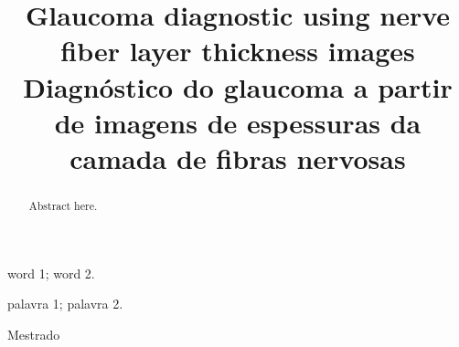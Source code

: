 \documentclass[conference]{IEEEtran}
\begin{document}
\title{Glaucoma diagnostic using nerve fiber layer thickness images \\ Diagnóstico do glaucoma a partir de imagens de espessuras da camada de fibras nervosas}


\author{
}


\maketitle

\thispagestyle{fancy}

\renewcommand{\abstractname}{Abstract}
\begin{abstract}
Abstract here.
\end{abstract}

\renewcommand\IEEEkeywordsname{Keywords}
\begin{IEEEkeywords}
\label{Keywords}
word 1; word 2.
\end{IEEEkeywords}

\renewcommand{\abstractname}{Resumo}
\begin{abstract}
\label{Resumo}

\end{abstract}

\renewcommand\IEEEkeywordsname{Palavras-chave}
\begin{IEEEkeywords}
\label{Palavras-chave}
palavra 1; palavra 2.
\end{IEEEkeywords}

\renewcommand\IEEEkeywordsname{Classifica\c{c}\~{a}o}
\begin{IEEEkeywords}
	\label{classificacao}
	Mestrado
\end{IEEEkeywords}
\end{document}
